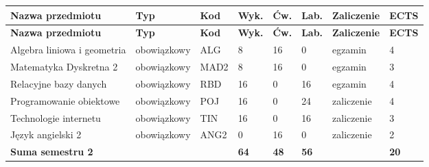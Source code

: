 \documentclass[12pt,a4paper]{article}
\newcommand{\thdrule}{\noalign{\global\setlength{\extrarowheight}{0pt}}}
\newcommand{\thdend}{\noalign{\global\setlength{\extrarowheight}{4pt}}}
\begin{document}
{\scriptsize
\begin{longtable}{m{5.0cm}m{1.9cm}m{0.75cm}m{0.85cm}m{0.85cm}m{0.85cm}m{1.45cm}m{0.9cm}}
\thdrule\toprule
\rowcolor{pjatkRed}
{\color{white}\footnotesize\textbf{\vphantom{Ag}Nazwa przedmiotu}} & {\color{white}\footnotesize\textbf{\vphantom{Ag}Typ}} & {\color{white}\footnotesize\textbf{\vphantom{Ag}Kod}} & {\color{white}\footnotesize\textbf{\vphantom{Ag}Wyk.}} & {\color{white}\footnotesize\textbf{\vphantom{Ag}Ćw.}} & {\color{white}\footnotesize\textbf{\vphantom{Ag}Lab.}} & {\color{white}\footnotesize\textbf{\vphantom{Ag}Zaliczenie}} & {\color{white}\footnotesize\textbf{\vphantom{Ag}ECTS}} \\
\midrule\thdend
\endfirsthead
\thdrule\toprule
\rowcolor{pjatkRed}
{\color{white}\footnotesize\textbf{\vphantom{Ag}Nazwa przedmiotu}} & {\color{white}\footnotesize\textbf{\vphantom{Ag}Typ}} & {\color{white}\footnotesize\textbf{\vphantom{Ag}Kod}} & {\color{white}\footnotesize\textbf{\vphantom{Ag}Wyk.}} & {\color{white}\footnotesize\textbf{\vphantom{Ag}Ćw.}} & {\color{white}\footnotesize\textbf{\vphantom{Ag}Lab.}} & {\color{white}\footnotesize\textbf{\vphantom{Ag}Zaliczenie}} & {\color{white}\footnotesize\textbf{\vphantom{Ag}ECTS}} \\
\midrule\thdend
\endhead
\rowcolor{tableRowLight} Algebra liniowa i geometria & {\scriptsize obowiązkowy} & ALG & 8 & 16 & 0 & {\scriptsize egzamin} & 4 \\
\rowcolor{tableRowAlt} Matematyka Dyskretna 2 & {\scriptsize obowiązkowy} & MAD2 & 8 & 16 & 0 & {\scriptsize egzamin} & 3 \\
\rowcolor{tableRowLight} Relacyjne bazy danych & {\scriptsize obowiązkowy} & RBD & 16 & 0 & 16 & {\scriptsize egzamin} & 4 \\
\rowcolor{tableRowAlt} Programowanie obiektowe & {\scriptsize obowiązkowy} & POJ & 16 & 0 & 24 & {\scriptsize zaliczenie} & 4 \\
\rowcolor{tableRowLight} Technologie internetu & {\scriptsize obowiązkowy} & TIN & 16 & 0 & 16 & {\scriptsize zaliczenie} & 3 \\
\rowcolor{tableRowAlt} Język angielski 2 & {\scriptsize obowiązkowy} & ANG2 & 0 & 16 & 0 & {\scriptsize zaliczenie} & 2 \\
\midrule[\heavyrulewidth]
\rowcolor{tableSummary} \textbf{Suma semestru 2} & & & \textbf{64} & \textbf{48} & \textbf{56} & & \textbf{20} \\
\bottomrule
\end{longtable}}

\end{document}
